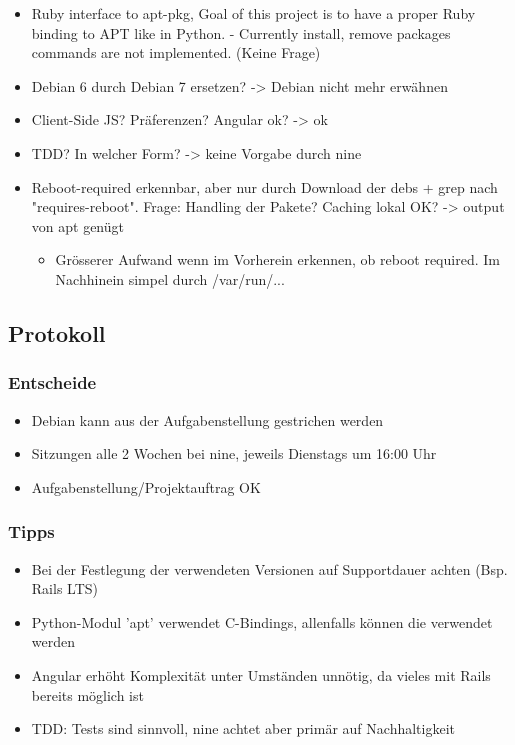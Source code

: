 \documentclass[class=scrbook,crop=false]{standalone}
\begin{document}
    \begin{itemize}
        \item Ruby interface to apt-pkg, Goal of this project is to have a proper Ruby binding to APT like in Python. - Currently install, remove packages commands are not implemented. (Keine Frage)
        \item Debian 6 durch Debian 7 ersetzen? -> Debian nicht mehr erwähnen
        \item Client-Side JS? Präferenzen? Angular ok? -> ok
        \item TDD? In welcher Form? -> keine Vorgabe durch \gls{nine}
        \item Reboot-required erkennbar, aber nur durch Download der debs + grep nach "requires-reboot". Frage: Handling der Pakete? Caching lokal OK? -> output von apt genügt
        \begin{itemize}
            \item Grösserer Aufwand wenn im Vorherein erkennen, ob reboot required. Im Nachhinein simpel durch /var/run/...
        \end{itemize}
    \end{itemize}
    
    \subsection*{Protokoll}
    
    \subsubsection*{Entscheide}
    
    \begin{itemize}
        \item Debian kann aus der Aufgabenstellung gestrichen werden
        \item Sitzungen alle 2 Wochen bei \gls{nine}, jeweils Dienstags um 16:00 Uhr
        \item Aufgabenstellung/Projektauftrag OK
    \end{itemize}
    
    \subsubsection*{Tipps}
    
	\begin{itemize}
        \item Bei der Festlegung der verwendeten Versionen auf Supportdauer achten (Bsp. Rails LTS)
        \item Python-Modul 'apt' verwendet C-Bindings, allenfalls können die verwendet werden
        \item Angular erhöht Komplexität unter Umständen unnötig, da vieles mit Rails bereits möglich ist
        \item TDD: Tests sind sinnvoll, \gls{nine} achtet aber primär auf Nachhaltigkeit
    \end{itemize}
    
\end{document}
